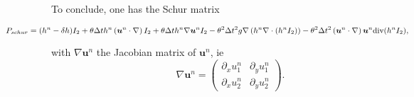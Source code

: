 \documentclass[a4paper, 11pt]{article}
\begin{document}
To conclude, one has the Schur matrix 
\begin{small}
\begin{equation*}
\hspace*{-2cm}P_{schur}=(h^n-\delta h)I_2+\theta\Delta th^n\left(\boldsymbol{u}^n\cdot\nabla\right)I_2+\theta\Delta th^n\nabla\boldsymbol{u}^nI_2-\theta^2\Delta t^2g\nabla\left(h^n\nabla\cdot\left(h^nI_2\right)\right)-\theta^2\Delta t^2\left(\boldsymbol{u}^n\cdot\nabla\right)\boldsymbol{u}^n\text{div}(h^nI_2),
\end{equation*}
\end{small}
with $\nabla\boldsymbol{u}^n$ the Jacobian matrix of $\boldsymbol{u}^n$, ie
\begin{equation*}
\nabla\boldsymbol{u}^n=
\begin{pmatrix}
\partial_x u_1^n &\partial_y u_1^n\\ \partial_x u_2^n &\partial_y u_2^n
\end{pmatrix}.
\end{equation*}
\end{document}
